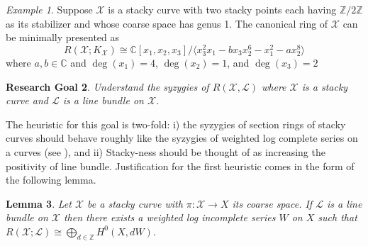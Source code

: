 \documentclass[11pt,reqno]{amsart}
\newtheorem{lemma}{Lemma}[section]
\newtheorem{goal}[lemma]{Research Goal}
\theoremstyle{remark}
\newtheorem{example}[lemma]{Example}
\newcommand{\CC}{\mathbb{C}}
\newcommand{\ZZ}{\mathbb{Z}}
\newcommand{\cL}{\mathcal{L}}
\newcommand{\cX}{\mathcal{X}}
\begin{document}


\begin{example}\label{example:canonical-ring}
Suppose $\cX$ is a stacky curve with two stacky points each having $\ZZ/2\ZZ$ as its stabilizer and whose coarse space has genus 1. The canonical ring of $\cX$ can be minimally presented as
\[
R(\cX;K_{\cX})\cong \CC[x_{1},x_{2},x_{3}]/\langle x_{3}^{2}x_{1}-bx_{3}x_{2}^{6}-x_{1}^{2}-ax_{2}^{8}\rangle
\]
where $a,b\in \CC$ and $\deg(x_{1})=4$, $\deg(x_{2})=1$, and $\deg(x_{3})=2$ \cite[Remark 8.3.6]{voightZurieckBrown22} 
\end{example}


\begin{goal}
	Understand the syzygies of $R(\cX,\cL)$ where $\cX$ is a stacky curve and $\cL$ is a line bundle on $\cX$. 
\end{goal}

The heuristic for this goal is two-fold: i) the syzygies of section rings of stacky curves should behave roughly like the syzygies of weighted log complete series on a curves (see \cite{brownErman25}), and ii) Stacky-ness should be thought of as increasing the positivity of line bundle. Justification for the first heuristic comes in the form of the following lemma.

\begin{lemma}
	Let $\cX$ be a stacky curve with $\pi:\cX\to X$ its coarse space. If $\cL$ is a line bundle on $\cX$ then there exists a weighted log incomplete series $W$ on $X$ such that $R(\cX;\cL)\cong \bigoplus_{d\in \ZZ} H^0(X, dW)$.
\end{lemma}
\end{document}
